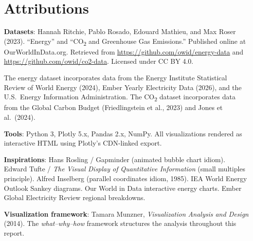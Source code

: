 \documentclass[10pt]{article}
\begin{document}
\section*{Attributions}

\textbf{Datasets}: Hannah Ritchie, Pablo Rosado, Edouard Mathieu, and Max Roser (2023). ``Energy'' and ``CO\textsubscript{2} and Greenhouse Gas Emissions.'' Published online at OurWorldInData.org. Retrieved from \url{https://github.com/owid/energy-data} and \url{https://github.com/owid/co2-data}. Licensed under CC BY 4.0.

The energy dataset incorporates data from the Energy Institute Statistical Review of World Energy (2024), Ember Yearly Electricity Data (2026), and the U.S.\ Energy Information Administration. The CO\textsubscript{2} dataset incorporates data from the Global Carbon Budget (Friedlingstein et al., 2023) and Jones et al.\ (2024).

\textbf{Tools}: Python 3, Plotly 5.x, Pandas 2.x, NumPy. All visualizations rendered as interactive HTML using Plotly's CDN-linked export.

\textbf{Inspirations}: Hans Rosling / Gapminder (animated bubble chart idiom). Edward Tufte / \emph{The Visual Display of Quantitative Information} (small multiples principle). Alfred Inselberg (parallel coordinates idiom, 1985). IEA World Energy Outlook Sankey diagrams. Our World in Data interactive energy charts. Ember Global Electricity Review regional breakdowns.

\textbf{Visualization framework}: Tamara Munzner, \emph{Visualization Analysis and Design} (2014). The \emph{what--why--how} framework structures the analysis throughout this report.
\end{document}
